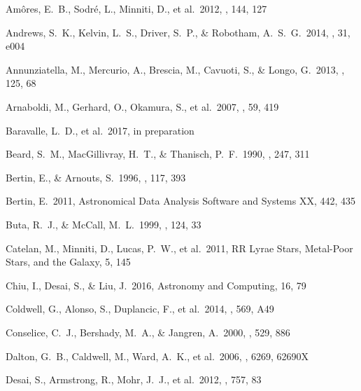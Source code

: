 \documentclass[preprint2]{aastex}
\begin{document}
\begin{thebibliography}{}

      Am{\^o}res, E.~B., Sodr{\'e}, L., Minniti, D., et al.\ 2012, \aj, 144, 127 

 Andrews, S.~K., Kelvin, L.~S., Driver, S.~P., \& Robotham, A.~S.~G.\ 2014, \pasa, 31, e004

      Annunziatella, M., Mercurio, A., Brescia, M., Cavuoti, S., \& Longo, G.\ 2013, \pasp, 125, 68 

  Arnaboldi, M., Gerhard, O., Okamura, S., et al.\ 2007, \pasj, 59, 419 

      \bibitem[Baravalle et al.(2017)]{} Baravalle, L.~D., et al.\ 2017, in preparation


    Beard, S.~M., MacGillivray, H.~T., \& Thanisch, P.~F.\ 1990, \mnras, 247, 311 

    Bertin, E., \& Arnouts, S.\ 1996, \aaps, 117, 393 
    
    Bertin, E.\ 2011, Astronomical Data Analysis Software and Systems XX, 442, 435

      Buta, R.~J., \& McCall, M.~L.\ 1999, \apjs, 124, 33 
      
    Catelan, M., Minniti, D., Lucas, P.~W., et al.\ 2011, RR Lyrae Stars, Metal-Poor Stars, and the Galaxy, 5, 145

      Chiu, I., Desai, S., \& Liu, J.\ 2016, Astronomy and Computing, 16, 79 

    
    Coldwell, G., Alonso, S., Duplancic, F., et al.\ 2014, \aap, 569, A49 
  
 Conselice, C.~J., Bershady, M.~A., \& Jangren, A.\ 2000, \apj, 529, 886 

 Dalton, G.~B., Caldwell, M., Ward, A.~K., et al.\ 2006, \procspie, 6269, 62690X

    Desai, S., Armstrong, R., Mohr, J.~J., et al.\ 2012, \apj, 757, 83 


\end{thebibliography}
\end{document}
